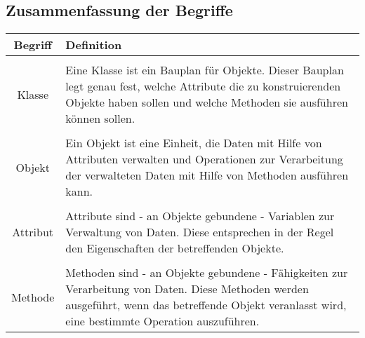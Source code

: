 \documentclass[]{scrartcl}   %
\begin{document}
\subsection{Zusammenfassung der Begriffe}

\begin{table}[ht]
\centering
\begin{tabular}{c|p{10cm}}
	\\Begriff & Definition\\
	\hline
	
	\\Klasse & Eine Klasse ist ein Bauplan für Objekte. Dieser Bauplan legt genau fest, welche Attribute die zu konstruierenden Objekte haben sollen und welche Methoden sie ausführen können sollen.\\
	
	\\Objekt & Ein Objekt ist eine Einheit, die Daten mit Hilfe von Attributen verwalten und Operationen zur Verarbeitung der verwalteten Daten mit Hilfe von Methoden ausführen kann.\\

	\\Attribut & Attribute sind - an Objekte gebundene - Variablen zur Verwaltung von Daten. Diese entsprechen in der Regel den Eigenschaften der betreffenden Objekte.\\

	\\Methode & Methoden sind - an Objekte gebundene - Fähigkeiten zur Verarbeitung von Daten. Diese Methoden werden ausgeführt, wenn das betreffende Objekt veranlasst wird, eine bestimmte Operation auszuführen.\\
\end{tabular}
\end{table}

\newpage
\end{document}
